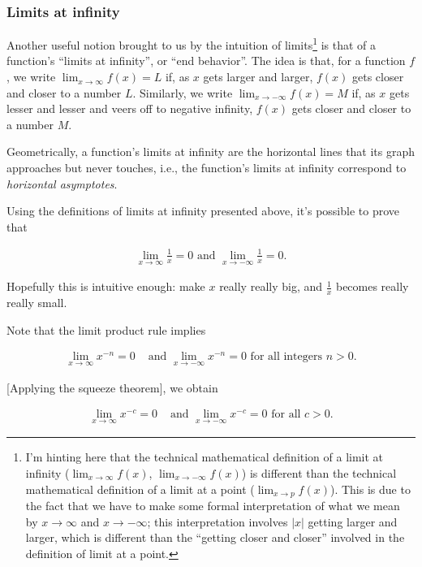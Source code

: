 \subsubsection*{Limits at infinity}

Another useful notion brought to us by the intuition of limits\footnote{I'm hinting here that the technical mathematical definition of a limit at infinity ($\lim_{x \rightarrow \infty} f(x)$, $\lim_{x \rightarrow -\infty} f(x)$) is different than the technical mathematical definition of a limit at a point ($\lim_{x \rightarrow p} f(x)$). This is due to the fact that we have to make some formal interpretation of what we mean by $x \rightarrow \infty$ and $x \rightarrow -\infty$; this interpretation involves $|x|$ getting larger and larger, which is different than the ``getting closer and closer'' involved in the definition of limit at a point.} is that of a function's ``limits at infinity'', or ``end behavior''. The idea is that, for a function $f$, we write $\lim_{x \rightarrow \infty} f(x) = L$ if, as $x$ gets larger and larger, $f(x)$ gets closer and closer to a number $L$. Similarly, we write $\lim_{x \rightarrow -\infty} f(x) = M$ if, as $x$ gets lesser and lesser and veers off to negative infinity, $f(x)$ gets closer and closer to a number $M$. 

Geometrically, a function's limits at infinity are the horizontal lines that its graph approaches but never touches, i.e., the function's limits at infinity correspond to \textit{horizontal asymptotes}.

Using the definitions of limits at infinity presented above, it's possible to prove that

\begin{align*}
    \lim_{x \rightarrow \infty} \frac{1}{x} = 0 \text{ and } \lim_{x \rightarrow -\infty} \frac{1}{x} = 0. 
\end{align*}

Hopefully this is intuitive enough: make $x$ really really big, and $\frac{1}{x}$ becomes really really small.

Note that the limit product rule implies

\begin{align*}
    \lim_{x \rightarrow \infty} x^{-n} = 0 &\text{ and } \lim_{x \rightarrow -\infty} x^{-n} = 0 \text{ for all integers $n > 0$}.
\end{align*}

[Applying the squeeze theorem], we obtain

\begin{align*}
    \lim_{x \rightarrow \infty} x^{-c} = 0 &\text{ and } \lim_{x \rightarrow -\infty} x^{-c} = 0 \text{ for all $c > 0$}.
\end{align*}

